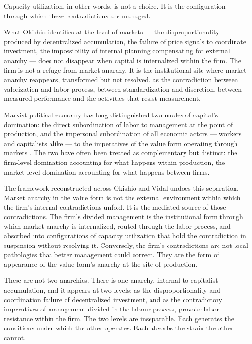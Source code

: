 Capacity utilization, in other words, is not a choice. It is the configuration through which these contradictions are managed.

What Okishio identifies at the level of markets — the disproportionality produced by decentralized accumulation, the failure of price signals to coordinate investment, the impossibility of internal planning compensating for external anarchy — does not disappear when capital is internalized within the firm. The firm is not a refuge from market anarchy. It is the institutional site where market anarchy reappears, transformed but not resolved, as the contradiction between valorization and labor process, between standardization and discretion, between measured performance and the activities that resist measurement.

Marxist political economy has long distinguished two modes of capital's domination: the direct subordination of labor to management at the point of production, and the impersonal subordination of all economic actors — workers and capitalists alike — to the imperatives of the value form operating through markets \citep{Basu2022}. The two have often been treated as complementary but distinct: the firm-level domination accounting for what happens within production, the market-level domination accounting for what happens between firms.

The framework reconstructed across Okishio and Vidal undoes this separation. Market anarchy in the value form is not the external environment within which the firm's internal contradictions unfold. It is the mediated source of those contradictions. The firm's divided management is the institutional form through which market anarchy is internalized, routed through the labor process, and absorbed into configurations of capacity utilization that hold the contradiction in suspension without resolving it. Conversely, the firm's contradictions are not local pathologies that better management could correct. They are the form of appearance of the value form's anarchy at the site of production.

These are not two anarchies. There is one anarchy, internal to capitalist accumulation, and it appears at two levels: as the disproportionality and coordination failure of decentralized investment, and as the contradictory imperatives of management divided  in the labour process,  provoke labor resistance within the firm. The two levels are inseparable. Each generates the conditions under which the other operates. Each absorbs the strain the other cannot.

